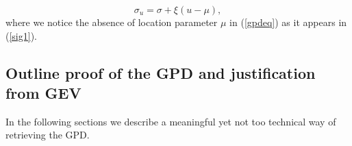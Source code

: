 \begin{equation}\label{sig1}
\sigma_{u}=\sigma+\xi (u-\mu),
\end{equation}
where we notice the absence of location parameter $\mu$ in (\ref{gpdeq}) as it appears in (\ref{sig1}). 

\subsection{Outline proof of the GPD and justification from GEV}
In the following sections we describe a meaningful yet not too technical way of retrieving the GPD.

